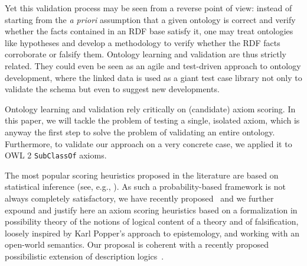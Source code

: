 \documentclass{llncs}
\begin{document}

Yet this validation process may be seen from a reverse point of view:
instead of starting from the \emph{a priori} assumption that a given ontology
is correct and verify whether the facts contained in an RDF base satisfy it,
one may treat ontologies like hypotheses and develop a methodology to verify
whether the RDF facts corroborate or falsify them. Ontology learning and validation
are thus strictly related.
They could even be seen as an agile and test-driven approach to ontology development,
where the linked data is used as a giant test case library not only to validate the
schema but even to suggest new developments.

Ontology learning and validation rely critically on (candidate) axiom scoring.
In this paper, we will tackle the problem of testing a single, isolated axiom,
which is anyway the first step to solve the problem of validating an entire ontology.
Furthermore, to validate our approach on a very concrete case, we applied it
to OWL 2 \texttt{SubClassOf} axioms.

The most popular scoring heuristics proposed in the literature are based
on statistical inference (see, e.g., \cite{BuehmannLehmann2012}).
As such a probability-based framework is not always completely satisfactory,
we have recently proposed~\cite{TettamanziFaronZuckerGandon2014ekaw}
and we further expound and justify here
an axiom scoring heuristics based on a formalization in possibility theory of
the notions of logical content of a theory and of falsification, loosely inspired
by Karl Popper's approach to epistemology, and working with an open-world semantics.
Our proposal is coherent with a recently proposed possibilistic extension of
description logics~\cite{QiPanJi2011,QiJiPanDu2010}.
\end{document}
